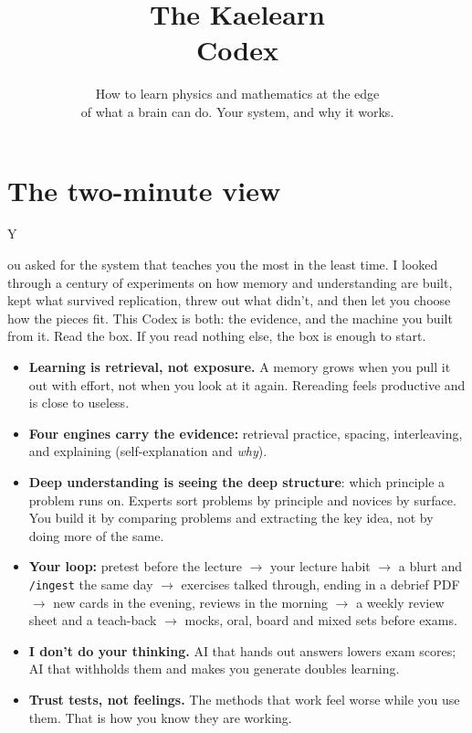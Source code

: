 \documentclass{kaelearn}
\title{The Kaelearn\\Codex}
\subtitle{How to learn physics and mathematics at the edge\\of what a brain can do. Your system, and why it works.}
\begin{document}
\makecover

\section{The two-minute view}

\opening{Y}{ou asked} for the system that teaches you the most in the least time. I looked
through a century of experiments on how memory and understanding are built, kept what survived
replication, threw out what didn't, and then let you choose how the pieces fit. This Codex is
both: the evidence, and the machine you built from it. Read the box. If you read nothing else,
the box is enough to start.

\begin{twominute}
\begin{itemize}
  \item \textbf{Learning is retrieval, not exposure.} A memory grows when you pull it out with
        effort, not when you look at it again. Rereading feels productive and is close to useless.
  \item \textbf{Four engines carry the evidence:} retrieval practice, spacing, interleaving, and
        explaining (self-explanation and \emph{why}).
  \item \textbf{Deep understanding is seeing the deep structure}: which principle a problem runs on.
        Experts sort problems by principle and novices by surface. You build it by comparing
        problems and extracting the key idea, not by doing more of the same.
  \item \textbf{Your loop:} pretest before the lecture $\to$ your lecture habit $\to$ a blurt and
        \texttt{/ingest} the same day $\to$ exercises talked through, ending in a debrief PDF $\to$ new
        cards in the evening, reviews in the morning $\to$ a weekly review sheet and a teach-back
        $\to$ mocks, oral, board and mixed sets before exams.
  \item \textbf{I don't do your thinking.} AI that hands out answers lowers exam scores; AI that
        withholds them and makes you generate doubles learning.
  \item \textbf{Trust tests, not feelings.} The methods that work feel worse while you use them.
        That is how you know they are working.
\end{itemize}
\end{twominute}
\end{document}
